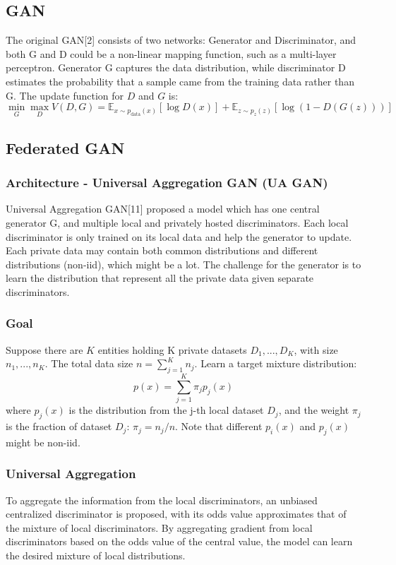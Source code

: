 \documentclass{article}
\begin{document}
\subsection{GAN}
The original GAN[2] consists of two networks: Generator and Discriminator, and both G and D could be a non-linear mapping function, such as a multi-layer perceptron. Generator G captures the data distribution, while discriminator D estimates the probability that a sample came from the training data rather than G.
The update function for $D$ and $G$ is:
\[
\min_{G} \max_{D} V(D,G) = \mathbb{E}_{x \sim p_{\text{data}}(x)} [\log D(x)] + \mathbb{E}_{z \sim p_{z}(z)} [\log (1-D(G(z)))]
\]


\subsection{Federated GAN}

\subsubsection{Architecture - Universal Aggregation GAN (UA GAN)}
Universal Aggregation GAN[11] proposed a model which has one central generator G, and multiple local and privately hosted discriminators. Each local discriminator is only trained on its local data and help the generator to update. Each private data may contain both common distributions and different distributions (non-iid), which might be a lot. The challenge for the generator is to learn the distribution that represent all the private data given separate discriminators.

\subsubsection{Goal}
Suppose there are $K$ entities holding K private datasets $D_1, ..., D_K$, with size $n_1, ..., n_K$. The total data size $n = \sum_{j=1}^{K} n_j$.
Learn a target mixture distribution:
\[
p(x) = \sum_{j=1}^{K} \pi_j p_j(x) 
\]
where $p_j(x)$ is the distribution from the j-th local dataset $D_j$, and the weight $\pi_j$ is the fraction of dataset $D_j$: $\pi_j = n_j / n$. Note that different $p_i(x)$ and $p_j(x)$ might be non-iid.

\subsubsection{Universal Aggregation}
To aggregate the information from the local discriminators, an unbiased centralized discriminator is proposed, with its odds value approximates that of the mixture of local discriminators. By aggregating gradient from local discriminators based on the odds value of the central value, the model can learn the desired mixture of local distributions.
\end{document}
